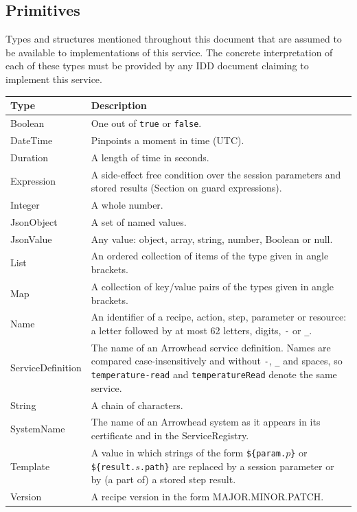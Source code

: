 \documentclass[a4paper]{arrowhead}
\newcommand{\pdef}[1]{{\textcolor{ArrowheadGrey}{#1\label{sec:model:primitives:#1}\label{sec:model:primitives:#1s}\label{sec:model:primitives:#1es}}}}
\begin{document}
\subsection{Primitives}
\label{sec:model:primitives}
Types and structures mentioned throughout this document that are assumed to be available to implementations of this
service. The concrete interpretation of each of these types must be provided by any IDD document claiming to implement
this service.

{\small
\begin{longtable}{|p{3.2cm}|p{12.6cm}|}

\hline
\rowcolor{gray!33} Type & Description \\ \hline
\endhead
\pdef{Boolean} & One out of \texttt{true} or \texttt{false}. \\ \hline
\pdef{DateTime} & Pinpoints a moment in time (UTC). \\ \hline
\pdef{Duration} & A length of time in seconds. \\ \hline
\pdef{Expression} & A side-effect free condition over the session parameters and stored results (Section on guard expressions). \\ \hline
\pdef{Integer} & A whole number. \\ \hline
\pdef{JsonObject} & A set of named values. \\ \hline
\pdef{JsonValue} & Any value: object, array, string, number, Boolean or null. \\ \hline
\pdef{List} & An ordered collection of items of the type given in angle brackets. \\ \hline
\pdef{Map} & A collection of key/value pairs of the types given in angle brackets. \\ \hline
\pdef{Name} & An identifier of a recipe, action, step, parameter or resource: a letter followed by at most 62 letters, digits, \texttt{-} or \texttt{\_}. \\ \hline
\pdef{ServiceDefinition} & The name of an Arrowhead service definition. Names are compared case-insensitively and without \texttt{-}, \texttt{\_} and spaces, so \texttt{temperature-\allowbreak{}read} and \texttt{temperature\allowbreak{}Read} denote the same service. \\ \hline
\pdef{String} & A chain of characters. \\ \hline
\pdef{SystemName} & The name of an Arrowhead system as it appears in its certificate and in the ServiceRegistry. \\ \hline
\pdef{Template} & A value in which strings of the form \texttt{\$\{param.$p$\}} or \texttt{\$\{result.$s$.path\}} are replaced by a session parameter or by (a part of) a stored step result. \\ \hline
\pdef{Version} & A recipe version in the form MAJOR.MINOR.PATCH. \\ \hline
\end{longtable}
}
\end{document}
